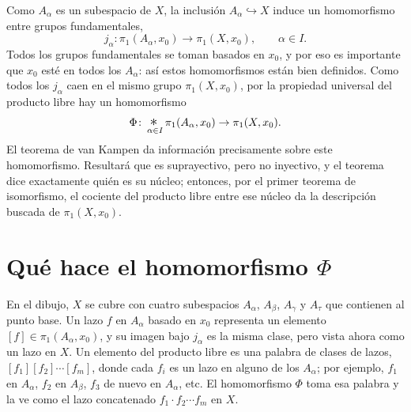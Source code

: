 \documentclass[11pt]{article}
\begin{document}
Como $A_\alpha$ es un subespacio de $X$, la inclusión $A_\alpha\hookrightarrow X$ induce un homomorfismo entre grupos fundamentales,
\[
  j_\alpha\colon\pi_1(A_\alpha,x_0)\to\pi_1(X,x_0),\qquad\alpha\in I.
\]
Todos los grupos fundamentales se toman basados en $x_0$, y por eso es importante que $x_0$ esté en todos los $A_\alpha$: así estos homomorfismos están bien definidos. Como todos los $j_\alpha$ caen en el mismo grupo $\pi_1(X,x_0)$, por la propiedad universal del producto libre hay un homomorfismo
\[
  \Phi\colon \mathop{\scalebox{1.4}{$*$}}_{\alpha\in I}\pi_1(A_\alpha,x_0)\to\pi_1(X,x_0).
\]
El teorema de van Kampen da información precisamente sobre este homomorfismo. Resultará que es suprayectivo, pero no inyectivo, y el teorema dice exactamente quién es su núcleo; entonces, por el primer teorema de isomorfismo, el cociente del producto libre entre ese núcleo da la descripción buscada de $\pi_1(X,x_0)$.

\section*{Qué hace el homomorfismo $\Phi$}

En el dibujo, $X$ se cubre con cuatro subespacios $A_\alpha$, $A_\beta$, $A_\gamma$ y $A_\tau$ que contienen al punto base. Un lazo $f$ en $A_\alpha$ basado en $x_0$ representa un elemento $[f]\in\pi_1(A_\alpha,x_0)$, y su imagen bajo $j_\alpha$ es la misma clase, pero vista ahora como un lazo en $X$. Un elemento del producto libre es una palabra de clases de lazos, $[f_1][f_2]\cdots[f_m]$, donde cada $f_i$ es un lazo en alguno de los $A_\alpha$; por ejemplo, $f_1$ en $A_\alpha$, $f_2$ en $A_\beta$, $f_3$ de nuevo en $A_\alpha$, etc. El homomorfismo $\Phi$ toma esa palabra y la ve como el lazo concatenado $f_1\cdot f_2\cdots f_m$ en $X$.

\begin{center}
\end{center}
\end{document}
